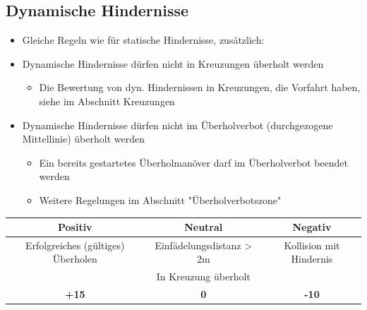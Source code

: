 \documentclass[a4paper, 11pt,usegeometry]{scrartcl}
\begin{document}
\subsection*{Dynamische Hindernisse}
\begin{itemize}
  \item Gleiche Regeln wie für statische Hindernisse, zusätzlich:
  \item Dynamische Hindernisse dürfen nicht in Kreuzungen überholt werden
  \begin{itemize}
  \item Die Bewertung von dyn. Hindernissen in Kreuzungen, die Vorfahrt haben, siehe im
  Abschnitt Kreuzungen
  \end{itemize}
  \item Dynamische Hindernisse dürfen nicht im Überholverbot (durchgezogene Mittellinie) überholt werden
  \begin{itemize}
  \item Ein bereits gestartetes Überholmanöver darf im Überholverbot beendet werden
  \item Weitere Regelungen im Abschnitt "Überholverbotszone"
  \end{itemize}
\end{itemize}

\begin{table}[H]
\begin{tabular}{|c|c|c|}
\hline
\rowcolor[HTML]{CACACA} 
\textbf{Positiv} & \textbf{Neutral} & \textbf{Negativ} \\ \hline
Erfolgreiches (gültiges) Überholen & Einfädelungsdistanz > 2m & Kollision mit Hindernis \\ \hline
& In Kreuzung überholt & \\ \hline
\textbf{+15} & \textbf{0} & \textbf{-10} \\ \hline
\end{tabular}
\end{table}
\end{document}
